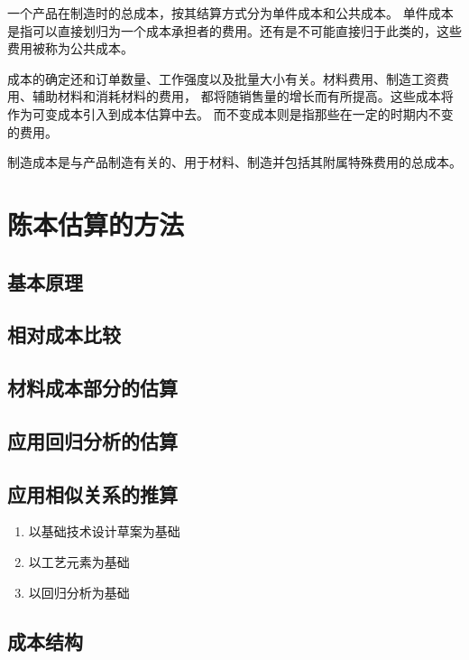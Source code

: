 \documentclass[letterpaper,10pt,english]{sphinxmanual}
\begin{document}
一个产品在制造时的总成本，按其结算方式分为单件成本和公共成本。
单件成本是指可以直接划归为一个成本承担者的费用。还有是不可能直接归于此类的，这些费用被称为公共成本。

成本的确定还和订单数量、工作强度以及批量大小有关。材料费用、制造工资费用、辅助材料和消耗材料的费用，
都将随销售量的增长而有所提高。这些成本将作为可变成本引入到成本估算中去。
而不变成本则是指那些在一定的时期内不变的费用。

制造成本是与产品制造有关的、用于材料、制造并包括其附属特殊费用的总成本。


\section{陈本估算的方法}
\label{unit9:id3}

\subsection{基本原理}
\label{unit9:id4}

\subsection{相对成本比较}
\label{unit9:id5}

\subsection{材料成本部分的估算}
\label{unit9:id6}

\subsection{应用回归分析的估算}
\label{unit9:id7}

\subsection{应用相似关系的推算}
\label{unit9:id8}\begin{enumerate}
\item {} 
以基础技术设计草案为基础

\item {} 
以工艺元素为基础

\item {} 
以回归分析为基础

\end{enumerate}


\subsection{成本结构}
\label{unit9:id9}
\end{document}
